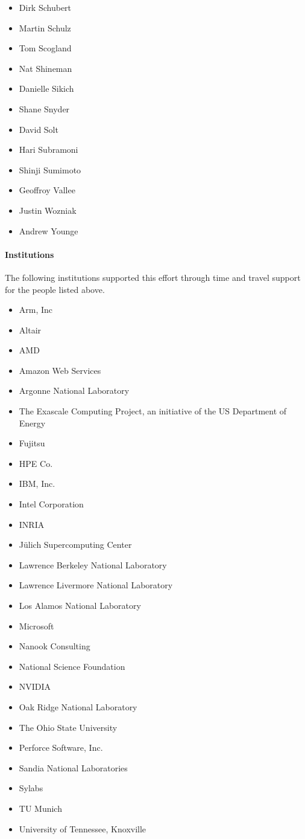 \begin{itemize}
    \item Dirk Schubert
    \item Martin Schulz
    \item Tom Scogland
    \item Nat Shineman
    \item Danielle Sikich
    \item Shane Snyder
    \item David Solt
    \item Hari Subramoni
    \item Shinji Sumimoto
    \item Geoffroy Vallee
    \item Justin Wozniak
    \item Andrew Younge
\end{itemize}

\paragraph*{Institutions}

The following institutions supported this effort through time and travel support for the people listed above.

\begin{itemize}
    \item Arm, Inc
    \item Altair
    \item AMD
    \item Amazon Web Services
    \item Argonne National Laboratory
    \item The Exascale Computing Project, an initiative of the US Department of Energy
    \item Fujitsu
    \item HPE Co.
    \item IBM, Inc.
    \item Intel Corporation
    \item INRIA
    \item Jülich Supercomputing Center
    \item Lawrence Berkeley National Laboratory
    \item Lawrence Livermore National Laboratory
    \item Los Alamos National Laboratory
    \item Microsoft
    \item Nanook Consulting
    \item National Science Foundation
    \item NVIDIA
    \item Oak Ridge National Laboratory
    \item The Ohio State University
    \item Perforce Software, Inc.
    \item Sandia National Laboratories
    \item Sylabs
    \item TU Munich
    \item University of Tennessee, Knoxville
\end{itemize}

